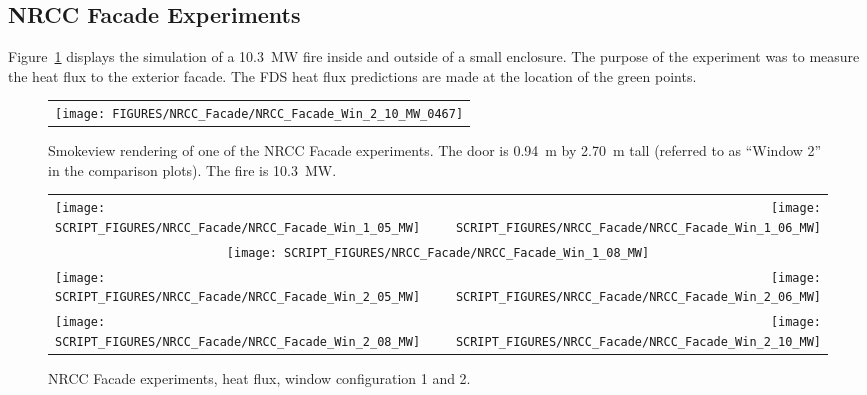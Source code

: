 \clearpage


\subsection{NRCC Facade Experiments}

Figure~\ref{NRCC_Facade_Image} displays the simulation of a 10.3~MW fire inside and outside of a small enclosure. The purpose of the experiment was to measure the heat flux to the exterior facade. The FDS heat flux predictions are made at the location of the green points.

\begin{figure}[h!]
\begin{center}
\begin{tabular}{c}
\texttt{[image: FIGURES/NRCC\_Facade/NRCC\_Facade\_Win\_2\_10\_MW\_0467]}
\end{tabular}
\end{center}
\caption[Smokeview rendering of NRCC Facade experiment]
{Smokeview rendering of one of the NRCC Facade experiments. The door is
0.94~m by 2.70~m tall (referred to as ``Window 2'' in the comparison plots). The
fire is 10.3~MW.}
\label{NRCC_Facade_Image}
\end{figure}

\newpage

\begin{figure}[p]
\begin{tabular*}{\textwidth}{l@{\extracolsep{\fill}}r}
\texttt{[image: SCRIPT\_FIGURES/NRCC\_Facade/NRCC\_Facade\_Win\_1\_05\_MW]} &
\texttt{[image: SCRIPT\_FIGURES/NRCC\_Facade/NRCC\_Facade\_Win\_1\_06\_MW]} \\
\multicolumn{2}{c}{\texttt{[image: SCRIPT\_FIGURES/NRCC\_Facade/NRCC\_Facade\_Win\_1\_08\_MW]}} \\
\texttt{[image: SCRIPT\_FIGURES/NRCC\_Facade/NRCC\_Facade\_Win\_2\_05\_MW]} &
\texttt{[image: SCRIPT\_FIGURES/NRCC\_Facade/NRCC\_Facade\_Win\_2\_06\_MW]} \\
\texttt{[image: SCRIPT\_FIGURES/NRCC\_Facade/NRCC\_Facade\_Win\_2\_08\_MW]} &
\texttt{[image: SCRIPT\_FIGURES/NRCC\_Facade/NRCC\_Facade\_Win\_2\_10\_MW]}
\end{tabular*}
\caption[NRCC Facade experiments, heat flux, window configuration 1 and 2]{NRCC Facade experiments, heat flux, window configuration 1 and 2.}
\label{NRCC_Facade_1}
\end{figure}

